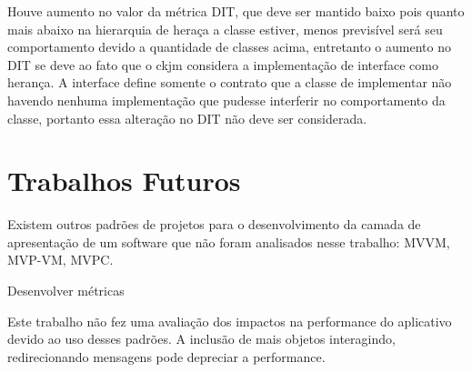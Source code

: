 Houve aumento no valor da métrica DIT, que deve ser mantido baixo pois quanto
mais abaixo na hierarquia de heraça a classe estiver, menos previsível será seu
comportamento devido a quantidade de classes acima, entretanto o aumento no DIT
se deve ao fato que o ckjm considera a implementação de interface como herança.
A interface define somente o contrato que a classe de implementar não havendo
nenhuma implementação que pudesse interferir no comportamento da classe,
portanto essa alteração no DIT não deve ser considerada.


\section{Trabalhos Futuros}

Existem outros padrões de projetos para o desenvolvimento da camada de
apresentação de um software que não foram analisados nesse trabalho: MVVM,
MVP-VM, MVPC.

Desenvolver métricas


Este trabalho não fez uma avaliação dos impactos na performance do aplicativo
devido ao uso desses padrões. A inclusão de mais objetos interagindo,
redirecionando mensagens pode depreciar a performance.
